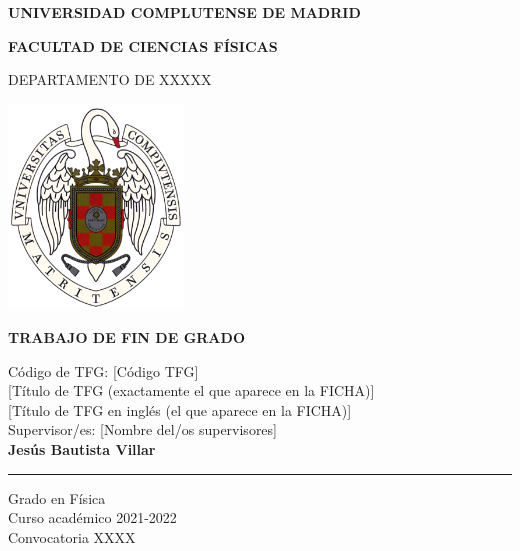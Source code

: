 \begin{titlepage}
\centering
{ \bfseries \Large UNIVERSIDAD COMPLUTENSE DE MADRID}
\vspace{0.5cm}

{\bfseries  \Large FACULTAD DE CIENCIAS FÍSICAS} 
\vspace{1cm}

{\large DEPARTAMENTO DE XXXXX}
\vspace{0.8cm}

{\includegraphics[width=0.35\textwidth]{fig/logo_UCM.png}}
\vspace{0.8cm}

{\bfseries \Large TRABAJO DE FIN DE GRADO}
\vspace{2cm}

{\Large Código de TFG:  [C\'odigo TFG] } \vspace{5mm} \\
{\Large [Título de TFG (exactamente el que aparece en la FICHA)]}\vspace{5mm} \\
{\Large [Título de TFG en ingl\'es (el que aparece en la FICHA)]}\vspace{5mm} \\
{\Large Supervisor/es: [Nombre del/os supervisores]}\vspace{20mm} \\ 

{\bfseries \LARGE Jesús Bautista Villar} \\
\noindent\rule{7cm}{0.4pt}\vspace{5mm}

{\large Grado en Física}\vspace{5mm} \\
{\large Curso acad\'emico 2021-2022}\vspace{5mm} \\
{\large Convocatoria XXXX}\vspace{5mm} \\ 

\end{titlepage}

